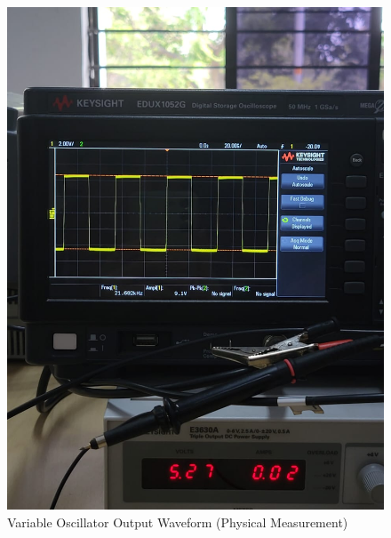 \documentclass[conference]{IEEEtran}
\begin{document}
\begin{figure}[htbp]
    \centering
    \includegraphics[width=0.8\linewidth]{variable.jpeg} %
    \caption{Variable Oscillator Output Waveform (Physical Measurement)}
    \label{fig:Variable_Oscillator}
\end{figure}
\end{document}
